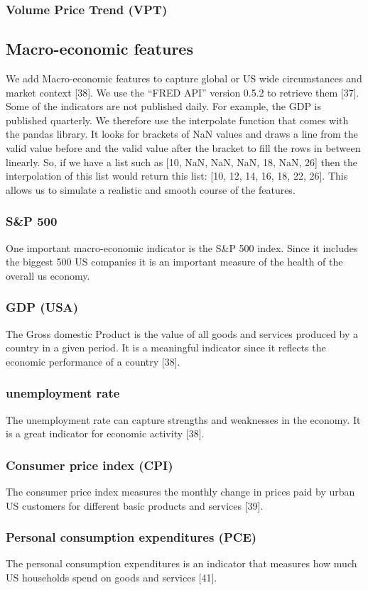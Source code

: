 \documentclass[a4paper,12pt]{report}
\begin{document}
			\subsubsection{Volume Price Trend (VPT)}
		\subsection{Macro-economic features}
		We add Macro-economic features to capture global or US wide circumstances and market context [38]. We use the “FRED API” version 0.5.2 to retrieve them [37]. Some of the indicators are not published daily. For example, the GDP is published quarterly. We therefore use the interpolate function that comes with the pandas library. It looks for brackets of NaN values and draws a line from the valid value before and the valid value after the bracket to fill the rows in between linearly. So, if we have a list such as [10, NaN, NaN, NaN, 18, NaN, 26] then the interpolation of this list would return this list: [10, 12, 14, 16, 18, 22, 26]. This allows us to simulate a realistic and smooth course of the features.
			\subsubsection{S\&P 500}
			One important macro-economic indicator is the S\&P 500 index. Since it includes the biggest 500 US companies it is an important measure of the health of the overall us economy.
			\subsubsection{GDP (USA)}
			The Gross domestic Product is the value of all goods and services produced by a country in a given period. It is a meaningful indicator since it reflects the economic performance of a country [38].
			\subsubsection{unemployment rate}
			The unemployment rate can capture strengths and weaknesses in the economy. It is a great indicator for economic activity [38].
			\subsubsection{Consumer price index (CPI)}
			The consumer price index measures the monthly change in prices paid by urban US customers for different basic products and services [39].
			\subsubsection{Personal consumption expenditures (PCE)}
			The personal consumption expenditures is an indicator that measures how much US households spend on goods and services [41].
\end{document}
